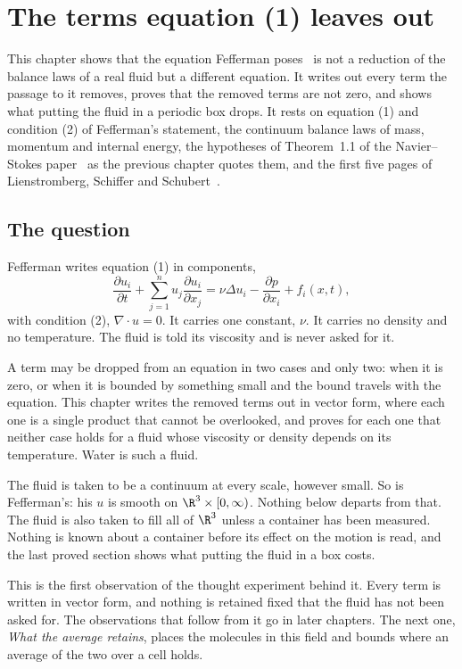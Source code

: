 \chapter{The terms equation (1) leaves out}

This chapter shows that the equation Fefferman poses~\cite{src:Fefferman} is not a reduction of
the balance laws of a real fluid but a different equation. It writes out every term the passage to
it removes, proves that the removed terms are not zero, and shows what putting the fluid in a
periodic box drops. It rests on equation (1) and condition (2) of Fefferman's statement, the
continuum balance laws of mass, momentum and internal energy, the hypotheses of Theorem~1.1 of the
Navier--Stokes paper~\cite{src:OpenAI-2026-Navier-Stokes} as the previous chapter quotes them, and
the first five pages of Lienstromberg, Schiffer and
Schubert~\cite{src:Lienstromberg-Schiffer-Schubert-2025}.

\section{The question}

Fefferman writes equation (1) in components,
\[
\frac{\partial u_i}{\partial t} + \sum_{j=1}^{n} u_j \frac{\partial u_i}{\partial x_j}
= \nu \Delta u_i - \frac{\partial p}{\partial x_i} + f_i(x,t),
\]
with condition (2), $\nabla\cdot u = 0$. It carries one constant, $\nu$. It carries no density and
no temperature. The fluid is told its viscosity and is never asked for it.

A term may be dropped from an equation in two cases and only two: when it is zero, or when it is
bounded by something small and the bound travels with the equation. This chapter writes the
removed terms out in vector form, where each one is a single product that cannot be overlooked,
and proves for each one that neither case holds for a fluid whose viscosity or density depends on
its temperature. Water is such a fluid.

The fluid is taken to be a continuum at every scale, however small. So is Fefferman's:
his $u$ is smooth on $\R^3\times[0,\infty)$. Nothing below departs from that. The fluid is also
taken to fill all of $\R^3$ unless a container has been measured. Nothing is known about a
container before its effect on the motion is read, and the last proved section shows what putting
the fluid in a box costs.

This is the first observation of the thought experiment behind it. Every term is written in vector
form, and nothing is retained fixed that the fluid has not been asked for. The observations that follow
from it go in later chapters. The next one, \emph{What the average retains}, places the molecules
in this field and bounds where an average of the two over a cell holds.

